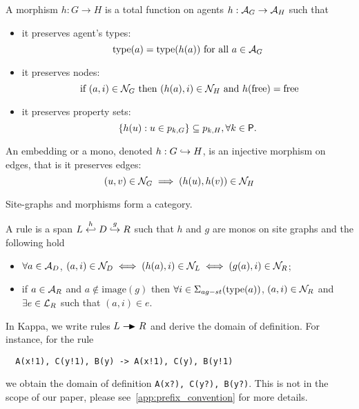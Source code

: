 \begin{definition}[Morphisms]
A morphism $h:G\to H$ is a total function on agents $h:\mathcal{A}_G\to\mathcal{A}_H$ such that
\begin{itemize}
\item it preserves agent's types:
\[
\operatorname{type}(a) = \operatorname{type}(h(a)) \text{ for all }a \in \mathcal{A}_G
\]
\item it preserves nodes:
\[
\text{ if }(a,i)\in \mathcal{N}_G \text{ then }(h(a),i) \in \mathcal{N}_H\text{ and }h(\text{free})=\text{free}
\]
\item it preserves property sets:
\[
\{h(u) : u\in p_{k,G}\} \subseteq p_{k,H}, \forall k\in\mathsf{P}.
\]
\end{itemize}
An embedding or a mono, denoted $h:G\hookrightarrow H$, is an injective morphism on edges, that is it preserves edges:
\[
(u,v)\in\mathcal{N}_G \implies (h(u),h(v))\in\mathcal{N}_H
\]
\end{definition}

\begin{lemma}
  Site-graphs and morphisms form a category.
\end{lemma}

\begin{definition}[Rules]
  \label{def:rule_site}
  A rule is a span $L\overset{h}{\hookleftarrow} D \overset{g}{\hookrightarrow} R$ such that $h$ and $g$ are monos on site graphs and the following hold
  \begin{itemize}
  \item $\forall a\in\mathcal{A}_D$, $(a,i)\in\mathcal{N}_D\iff (h(a),i)\in\mathcal{N}_L \iff (g(a),i)\in\mathcal{N}_R$;
  \item if $a\in\mathcal{A}_R$ and $a\notin\text{image}(g)$ then $\forall i\in\Sigma_{ag-st}(\operatorname{type}(a))$, $(a,i)\in\mathcal{N}_R$ and $\exists e\in \mathcal{L}_R$ such that $(a,i)\in e$.
  \end{itemize}
\end{definition}

\begin{example}
In Kappa, we write rules $L\action R$ and derive the domain of definition. For instance, for the rule
\begin{verbatim}
  A(x!1), C(y!1), B(y) -> A(x!1), C(y), B(y!1)
\end{verbatim}
we obtain the domain of definition \verb|A(x?), C(y?), B(y?)|. This is not in the scope of our paper, please see~\autoref{app:prefix_convention} for more details.
\end{example}

